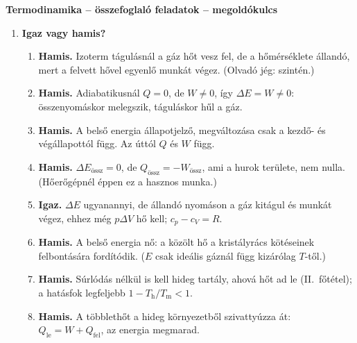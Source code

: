 \documentclass[11pt,a4paper]{article}
\begin{document}
\begin{center}
  {\Large\bfseries Termodinamika -- összefoglaló feladatok -- megoldókulcs}\\[4pt]
\end{center}

\begin{enumerate}
\item \textbf{Igaz vagy hamis?}
  \begin{enumerate}
    \item \textbf{Hamis.} Izoterm tágulásnál a gáz hőt vesz fel, de a hőmérséklete
      állandó, mert a felvett hővel egyenlő munkát végez. (Olvadó jég: szintén.)
    \item \textbf{Hamis.} Adiabatikusnál $Q = 0$, de $W \neq 0$, így $\Delta E = W \neq 0$:
      összenyomáskor melegszik, táguláskor hűl a gáz.
    \item \textbf{Hamis.} A belső energia állapotjelző, megváltozása csak a kezdő- és
      végállapottól függ. Az úttól $Q$ és $W$ függ.
    \item \textbf{Hamis.} $\Delta E_\text{össz} = 0$, de $Q_\text{össz} = -W_\text{össz}$,
      ami a hurok területe, nem nulla. (Hőerőgépnél éppen ez a hasznos munka.)
    \item \textbf{Igaz.} $\Delta E$ ugyanannyi, de állandó nyomáson a gáz kitágul és
      munkát végez, ehhez még $p\Delta V$ hő kell; $c_p - c_V = R$.
    \item \textbf{Hamis.} A belső energia nő: a közölt hő a kristályrács kötéseinek
      felbontására fordítódik. ($E$ csak ideális gáznál függ kizárólag $T$-től.)
    \item \textbf{Hamis.} Súrlódás nélkül is kell hideg tartály, ahová hőt ad le
      (II.~főtétel); a hatásfok legfeljebb $1 - T_\text{h}/T_\text{m} < 1$.
    \item \textbf{Hamis.} A többlethőt a hideg környezetből szivattyúzza át:
      $Q_\text{le} = W + Q_\text{fel}$, az energia megmarad.
  \end{enumerate}


\end{enumerate}
\end{document}
